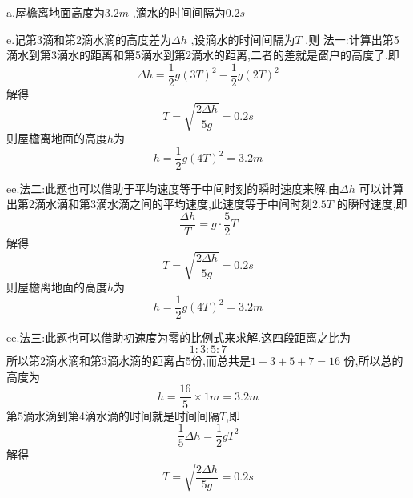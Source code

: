 \begin{calculate}
a.屋檐离地面高度为$3.2m$ ,滴水的时间间隔为$0.2s$

e.记第3滴和第2滴水滴的高度差为$\Delta h$ ,设滴水的时间间隔为$T$ ,则
法一:计算出第5滴水到第3滴水的距离和第5滴水到第2滴水的距离,二者的差就是窗户的高度了.即
$$\Delta h=\frac{1}{2}g(3T)^2-\frac{1}{2}g(2T)^2$$
解得
$$T=\sqrt{\frac{2\Delta h}{5g}}=0.2s$$
则屋檐离地面的高度$h$为
$$h=\frac{1}{2}g(4T)^2=3.2m$$

ee.法二:此题也可以借助于平均速度等于中间时刻的瞬时速度来解.由$\Delta h$ 可以计算出第2滴水滴和第3滴水滴之间的平均速度,此速度等于中间时刻$2.5T$ 的瞬时速度,即
$$\frac{\Delta h}{T}=g\cdot \frac{5}{2}T$$
解得
$$T=\sqrt{\frac{2\Delta h}{5g}}=0.2s$$
则屋檐离地面的高度$h$为
$$h=\frac{1}{2}g(4T)^2=3.2m$$

ee.法三:此题也可以借助初速度为零的比例式来求解.这四段距离之比为
$$1:3:5:7$$
所以第2滴水滴和第3滴水滴的距离占5份,而总共是$1+3+5+7=16$ 份,所以总的高度为
$$h=\frac{16}{5}\times 1m=3.2m$$
第5滴水滴到第4滴水滴的时间就是时间间隔$T$,即
$$\frac{1}{5}\Delta h=\frac{1}{2}gT^2$$
解得
$$T=\sqrt{\frac{2\Delta h}{5g}}=0.2s$$

\end{calculate}
